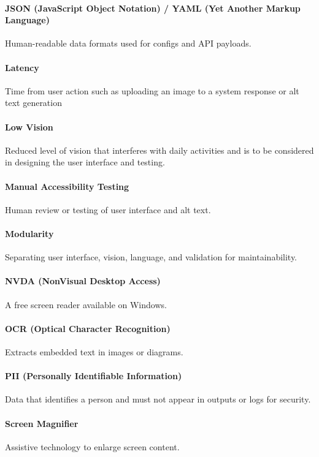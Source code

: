 \documentclass[12pt, titlepage]{article}
\begin{document}
\paragraph*{JSON (JavaScript Object Notation) / YAML (Yet Another
Markup Language)}
Human-readable data formats used for configs and API payloads.

\paragraph*{Latency}
Time from user action such as uploading an image to a system response
or alt text generation

\paragraph*{Low Vision}
Reduced level of vision that interferes with daily activities and is
to be considered in designing the user interface and testing.

\paragraph*{Manual Accessibility Testing}
Human review or testing of user interface and alt text.

\paragraph*{Modularity}
Separating user interface, vision, language, and validation for maintainability.

\paragraph*{NVDA (NonVisual Desktop Access)}
A free screen reader available on Windows.

\paragraph*{OCR (Optical Character Recognition)}
Extracts embedded text in images or diagrams.

\paragraph*{PII (Personally Identifiable Information)}
Data that identifies a person and must not appear in outputs or logs
for security.

\paragraph*{Screen Magnifier}
Assistive technology to enlarge screen content.
\end{document}
